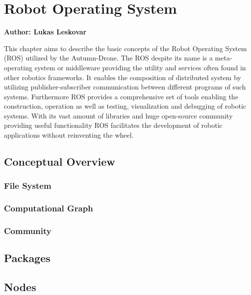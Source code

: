 \chapter{Robot Operating System}

\textbf{Author: Lukas Leskovar} 

This chapter aims to describe the basic concepts of the Robot Operating System (ROS) utilized by the Autumn-Drone. The ROS despite its name is a meta-operating system or middleware providing the utility and services often found in other robotics frameworks. It enables the composition of distributed system by utilizing publisher-subscriber communication between different programs of such systems. Furthermore ROS provides a comprehensive set of tools enabling the construction, operation as well as testing, visualization and debugging of robotic systems. With its vast amount of libraries and huge open-source community providing useful functionality ROS facilitates the development of robotic applications without reinventing the wheel.


\section{Conceptual Overview}

\subsection{File System}

\subsection{Computational Graph}

\subsection{Community}



\section{Packages}



\section{Nodes}



